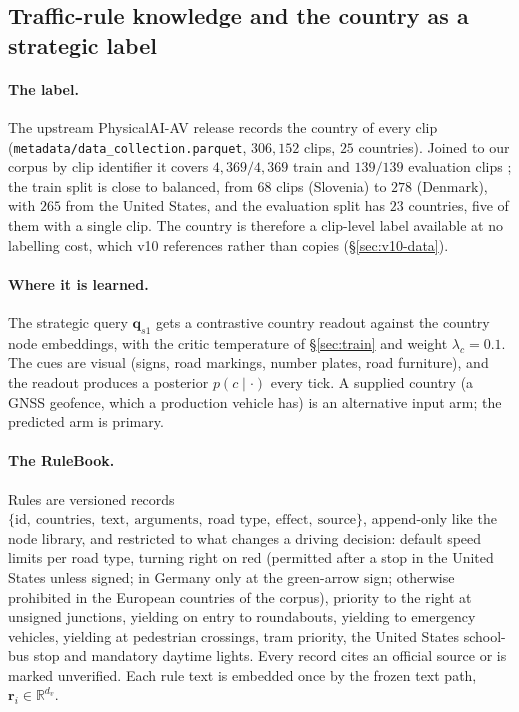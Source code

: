 \subsection{Traffic-rule knowledge and the country as a strategic label}\label{sec:rules}
\paragraph{The label.} The upstream PhysicalAI-AV release records the country of every clip (\texttt{metadata/data\_collection.parquet}, $306{,}152$ clips, $25$ countries). Joined to our corpus by clip identifier it covers $4{,}369/4{,}369$ train and $139/139$ evaluation clips \evM; the train split is close to balanced, from $68$ clips (Slovenia) to $278$ (Denmark), with $265$ from the United States, and the evaluation split has $23$ countries, five of them with a single clip. The country is therefore a clip-level label available at no labelling cost, which v10 references rather than copies (\S\ref{sec:v10-data}).
\paragraph{Where it is learned.} The strategic query $\mathbf q_{s1}$ gets a contrastive country readout against the country node embeddings, with the critic temperature of \S\ref{sec:train} and weight $\lambda_c=0.1$. The cues are visual (signs, road markings, number plates, road furniture), and the readout produces a posterior $p(c\mid\cdot)$ every tick. A supplied country (a GNSS geofence, which a production vehicle has) is an alternative input arm; the predicted arm is primary.
\paragraph{The RuleBook.} Rules are versioned records $\{\text{id},\ \text{countries},\ \text{text},\ \text{arguments},\ \text{road type},\ \text{effect},\ \text{source}\}$, append-only like the node library, and restricted to what changes a driving decision: default speed limits per road type, turning right on red (permitted after a stop in the United States unless signed; in Germany only at the green-arrow sign; otherwise prohibited in the European countries of the corpus), priority to the right at unsigned junctions, yielding on entry to roundabouts, yielding to emergency vehicles, yielding at pedestrian crossings, tram priority, the United States school-bus stop and mandatory daytime lights. Every record cites an official source or is marked unverified. Each rule text is embedded once by the frozen text path, $\mathbf r_i\in\mathbb R^{d_v}$.

